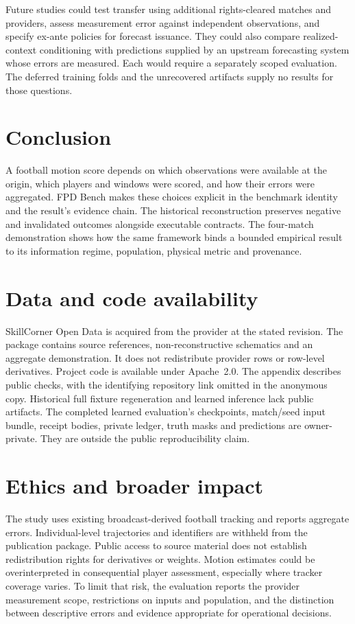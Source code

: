 \documentclass[10pt]{article}
\begin{document}
Future studies could test transfer using additional rights-cleared matches and providers, assess measurement error against independent observations, and specify ex-ante policies for forecast issuance. They could also compare realized-context conditioning with predictions supplied by an upstream forecasting system whose errors are measured. Each would require a separately scoped evaluation. The deferred training folds and the unrecovered artifacts supply no results for those questions.

\section{Conclusion}

A football motion score depends on which observations were available at the origin, which players and windows were scored, and how their errors were aggregated. FPD Bench makes these choices explicit in the benchmark identity and the result's evidence chain. The historical reconstruction preserves negative and invalidated outcomes alongside executable contracts. The four-match demonstration shows how the same framework binds a bounded empirical result to its information regime, population, physical metric and provenance.

\section*{Data and code availability}

SkillCorner Open Data is acquired from the provider at the stated revision. The package contains source references, non-reconstructive schematics and an aggregate demonstration. It does not redistribute provider rows or row-level derivatives. Project code is available under Apache~2.0. The appendix describes public checks, with the identifying repository link omitted in the anonymous copy. Historical full fixture regeneration and learned inference lack public artifacts. The completed learned evaluation's checkpoints, match/seed input bundle, receipt bodies, private ledger, truth masks and predictions are owner-private. They are outside the public reproducibility claim.

\section*{Ethics and broader impact}

The study uses existing broadcast-derived football tracking and reports aggregate errors. Individual-level trajectories and identifiers are withheld from the publication package. Public access to source material does not establish redistribution rights for derivatives or weights. Motion estimates could be overinterpreted in consequential player assessment, especially where tracker coverage varies. To limit that risk, the evaluation reports the provider measurement scope, restrictions on inputs and population, and the distinction between descriptive errors and evidence appropriate for operational decisions.




\clearpage
\appendix

\end{document}
